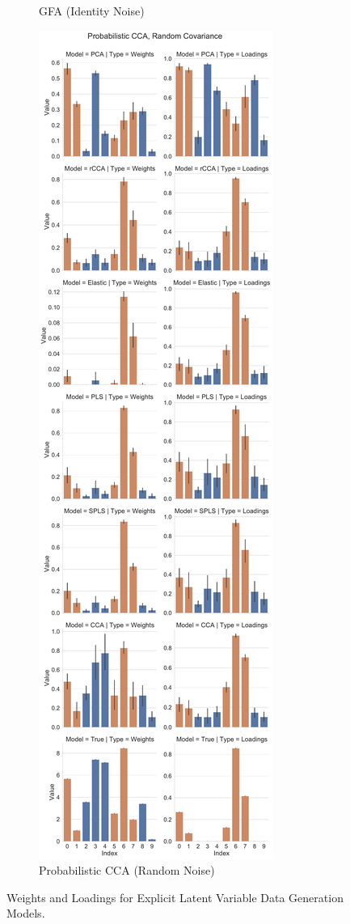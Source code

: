 \begin{figure}
\begin{subfigure}{0.49\linewidth}
\caption{GFA (Identity Noise)}
\end{subfigure}
%
\begin{subfigure}{0.49\linewidth}
\centering
\includegraphics[width=\linewidth]{figures/simulated/low/Combined_Weights_Loadings_with_Error_Bars_Random_Covariance_explicit}
\caption{Probabilistic CCA (Random Noise)}
\end{subfigure}
\caption{Weights and Loadings for Explicit Latent Variable Data Generation Models.}\label{fig:latent-variable-weights-loadings}
\end{figure}

